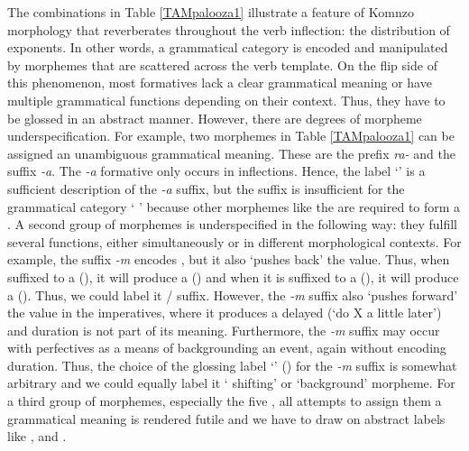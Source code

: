 The combinations in Table \ref{TAMpalooza1} illustrate a feature of Komnzo morphology that reverberates throughout the verb inflection: the distribution of exponents. In other words, a grammatical category is encoded and manipulated by morphemes that are scattered across the verb template. On the flip side of this phenomenon, most formatives lack a clear grammatical meaning or have multiple grammatical functions depending on their context. Thus, they have to be glossed in an abstract manner. However, there are degrees of morpheme underspecification. For example, two morphemes in Table \ref{TAMpalooza1} can be assigned an unambiguous grammatical meaning. These are the  prefix \emph{ra-} and the  suffix \emph{-a}. The \emph{-a} formative only occurs in   inflections. Hence, the label `' is a sufficient description of the \emph{-a} suffix, but the suffix is insufficient for the grammatical category ` ' because other morphemes like the  are required to form a  . A second group of morphemes is underspecified in the following way: they fulfill several functions, either simultaneously or in different morphological contexts. For example, the  suffix \emph{-m} encodes  , but it also `pushes back' the  value. Thus, when suffixed to a  (), it will produce a  () and when it is suffixed to a  (), it will produce a  (). Thus, we could label it / suffix. However, the \emph{-m} suffix also `pushes forward' the  value in the imperatives, where it produces a delayed  (`do X a little later') and duration is not part of its meaning. Furthermore, the \emph{-m} suffix may occur with perfectives as a means of backgrounding an event, again without encoding duration. Thus, the choice of the glossing label `' (\Dur) for the \emph{-m} suffix is somewhat arbitrary and we could equally label it ` shifting' or `background' morpheme. For a third group of morphemes, especially the five , all attempts to assign them a grammatical meaning is rendered futile and we have to draw on abstract labels like \Alph{}, \Bet{} and \Gam{}.\\

